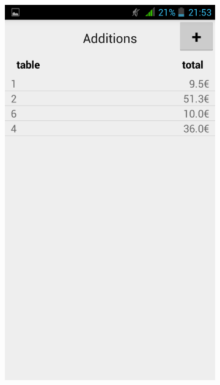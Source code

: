\begin{figure}[H]
	\centering
	\begin{subfigure}
		\centering
		\includegraphics[scale=0.15]{img/bills-list.png}
	\end{subfigure}%
	~
	\begin{subfigure}
		\centering

\end{subfigure}
\end{figure}
